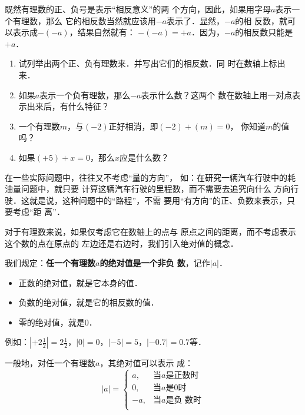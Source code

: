 既然有理数的正、负号是表示“相反意义”的两
个方向，因此，如果用字母$a$表示一个有理数，那么
它的相反数当然就应该用$-a$表示了．显然，$-a$的相
反数，就可以表示成$-(- a)$，结果自然就有：
$-(-a)=+a$．因为，$-a$的相反数只能是$+a$．

\begin{ex}
	\begin{enumerate}
		\item 试列举出两个正、负有理数来．并写出它们的相反数．同
		时在数轴上标出来．
		\item 如果$a$表示一个负有理数，那么$-a$表示什么数？这两个
		数在数轴上用一对点表示出来后，有什么特征？
		\item 一个有理数$m$，与$(-2)$正好相消，即$(-2)+(m)=0$，
		你知道$m$的值吗？
		\item 如果$(+5) +x=0$，那么$x$应是什么数？
	\end{enumerate}    
\end{ex}    

在一些实际问题中，往往又不考虑“量的方向”，
如：在研究一辆汽车行驶中的耗油量问题中，就只要
计算这辆汽车行驶的里程数，而不需要去追究向什么
方向行驶．这就是说，这种问题中的“路程”，不需
要用“有方向”的正、负数来表示，只要考虑“距
离”．

对于有理数来说，如果仅考虑它在数轴上的点与
原点之间的距离，而不考虑表示这个数的点在原点的
左边还是右边时，我们引入绝对值的概念．

我们规定：\textbf{任一个有理数$a$的绝对值是一个非负
	数}，记作$|a|$．

\begin{blk}{}
	\begin{itemize}
		\item 正数的绝对值，就是它本身的值．
		\item 负数的绝对值，就是它的相反数的值．
		\item 零的绝对值，就是0．
	\end{itemize}
\end{blk}

例如：$\left|+2\frac{1}{2}\right|=2\frac{1}{2}$，$|0|=0$，$|-5|=5$，$|-0.7|=0.7$等．

一般地，对任一个有理数$a$，其绝对值可以表示
成：
\[|a|=\begin{cases}
a, & \text{当$a$是正数时}\\
0, & \text{当$a$是0时}\\
-a, & \text{当$a$是负 数时}\\
\end{cases}\]

